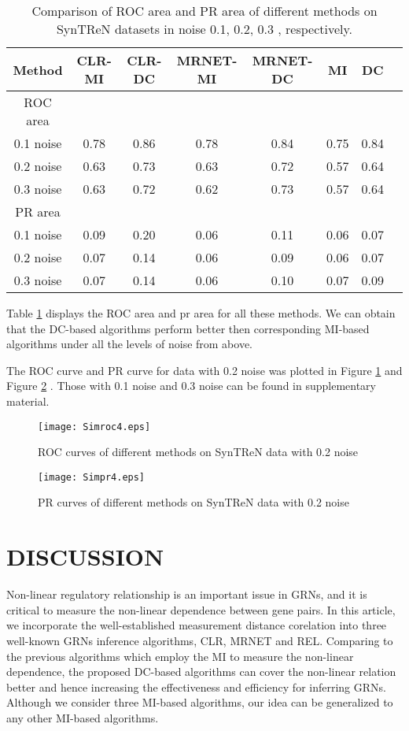 \documentclass{bioinfo}
\begin{document}
\begin{table}[0.5\textwidth] \tiny
\centering \caption{Comparison of ROC area and PR area of different
methods on SynTReN datasets in noise 0.1, 0.2, 0.3 ,
respectively.}\label{noisy-roc-pr}
\begin{tabular}{cccccccc}
 \hline
 Method & CLR-MI & CLR-DC & MRNET-MI & MRNET-DC & MI & DC \\
 \hline
  ROC area\\
 0.1 noise & 0.78 & 0.86 & 0.78 & 0.84 & 0.75 & 0.84  \\
 0.2 noise & 0.63 & 0.73 & 0.63 & 0.72 & 0.57 & 0.64 \\
 0.3 noise & 0.63 & 0.72 & 0.62 & 0.73 & 0.57 & 0.64 \\
 PR area\\
 0.1 noise & 0.09 & 0.20 & 0.06 & 0.11 & 0.06 & 0.07  \\
 0.2 noise & 0.07 & 0.14 & 0.06 & 0.09 & 0.06 & 0.07  \\
 0.3 noise & 0.07 & 0.14 & 0.06 & 0.10 & 0.07 & 0.09 \\
  \hline
\end{tabular}
\end{table}

 Table \ref{noisy-roc-pr} displays the ROC area and pr area for all
 these methods. We can obtain that the DC-based algorithms perform
 better then corresponding MI-based algorithms under all the levels
 of noise from above.

   The ROC curve and PR curve for data with 0.2 noise was plotted in
   Figure \ref{noisy-roc} and Figure \ref{noisy-pr}
 . Those with 0.1 noise and 0.3 noise can be found in
 supplementary material.
 \begin{figure}[!h]
  \texttt{[image: Simroc4.eps]}
  \caption{ROC curves of different methods on SynTReN data with 0.2 noise}\label{noisy-roc}
\end{figure}

\begin{figure}[!h]
  \texttt{[image: Simpr4.eps]}
  \caption{PR curves of different methods on SynTReN data with 0.2 noise}\label{noisy-pr}
\end{figure}



\section{DISCUSSION}

Non-linear regulatory relationship is an important issue in GRNs,
and it is critical to measure the non-linear dependence between gene
pairs. In this article, we incorporate the well-established
measurement distance corelation into three well-known GRNs inference
algorithms, CLR, MRNET and REL. Comparing to the previous algorithms
which employ the MI to measure the non-linear dependence, the
proposed DC-based algorithms can cover the non-linear relation
better and hence increasing the effectiveness and efficiency for
inferring GRNs. Although we consider three MI-based algorithms, our
idea can be generalized to any other MI-based algorithms.
\end{document}
